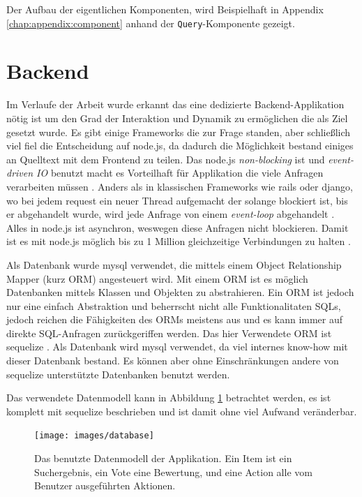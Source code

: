 \documentclass[12pt,twoside]{book}
\begin{document}
Der Aufbau der eigentlichen Komponenten, wird Beispielhaft in Appendix \ref{chap:appendix:component} anhand der \texttt{Query}-Komponente gezeigt.

\section{Backend}\label{sec:backend}

Im Verlaufe der Arbeit wurde erkannt das eine dedizierte Backend-Applikation nötig ist um den Grad der Interaktion und Dynamik zu ermöglichen die als Ziel gesetzt wurde. Es gibt einige Frameworks die zur Frage standen, aber schließlich viel fiel die Entscheidung auf node.js, da dadurch die Möglichkeit bestand einiges an Quelltext mit dem Frontend zu teilen. Das node.js \textit{non-blocking} ist und \textit{event-driven IO} benutzt macht es Vorteilhaft für Applikation die viele Anfragen verarbeiten müssen \citep{tilkov2010node}. Anders als in klassischen Frameworks wie rails oder django, wo bei jedem request ein neuer Thread aufgemacht der solange blockiert ist, bis er abgehandelt wurde, wird jede Anfrage von einem \textit{event-loop} abgehandelt \citep{tilkov2010node}. Alles in node.js ist asynchron, weswegen diese Anfragen nicht blockieren. Damit ist es mit node.js möglich bis zu 1 Million gleichzeitige Verbindungen zu halten \cite{node1m}.

Als Datenbank wurde mysql verwendet, die mittels einem Object Relationship Mapper (kurz ORM) angesteuert wird. Mit einem ORM ist es möglich Datenbanken mittels Klassen und Objekten zu abstrahieren. Ein ORM ist jedoch nur eine einfach Abstraktion und beherrscht nicht alle Funktionalitaten SQLs, jedoch reichen die Fähigkeiten des ORMs meistens aus und es kann immer auf direkte SQL-Anfragen zurückgeriffen werden. Das hier Verwendete ORM ist sequelize \cite{sequelize}. Als Datenbank wird mysql verwendet, da viel internes know-how mit dieser Datenbank bestand. Es können aber ohne Einschränkungen andere von sequelize unterstützte Datenbanken benutzt werden.

Das verwendete Datenmodell kann in Abbildung \ref{fig:database} betrachtet werden, es ist komplett mit sequelize beschrieben und ist damit ohne viel Aufwand veränderbar.

\begin{figure}[htbp]
	\centering
	\texttt{[image: images/database]}
	\caption{Das benutzte Datenmodell der Applikation. Ein Item ist ein Suchergebnis, ein Vote eine Bewertung, und eine Action alle vom Benutzer ausgeführten Aktionen.}
	\label{fig:database}
\end{figure}
\end{document}
